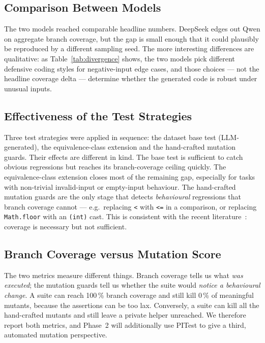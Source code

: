 \documentclass[journal]{IEEEtran}
\begin{document}
\subsection{Comparison Between Models}

The two models reached comparable headline numbers. DeepSeek edges out
Qwen on aggregate branch coverage, but the gap is small enough that it
could plausibly be reproduced by a different sampling seed. The more
interesting differences are qualitative: as Table~\ref{tab:divergence}
shows, the two models pick different defensive coding styles for
negative-input edge cases, and those choices --- not the headline coverage
delta --- determine whether the generated code is robust under unusual
inputs.

\subsection{Effectiveness of the Test Strategies}

Three test strategies were applied in sequence: the dataset base test
(LLM-generated), the equivalence-class extension and the hand-crafted
mutation guards. Their effects are different in kind. The base test is
sufficient to catch obvious regressions but reaches its branch-coverage
ceiling quickly. The equivalence-class extension closes most of the
remaining gap, especially for tasks with non-trivial invalid-input or
empty-input behaviour. The hand-crafted mutation guards are the only
stage that detects \emph{behavioural} regressions that branch coverage
cannot --- e.g.\ replacing \verb|<| with \verb|<=| in a comparison, or
replacing \texttt{Math.floor} with an \texttt{(int)} cast. This is
consistent with the recent
literature~\cite{metatestgen,yang2024,lit_review}: coverage is necessary
but not sufficient.

\subsection{Branch Coverage versus Mutation Score}

The two metrics measure different things. Branch coverage tells us what
\emph{was executed}; the mutation guards tell us whether the suite would
\emph{notice a behavioural change}. A suite can reach 100\,\% branch
coverage and still kill 0\,\% of meaningful mutants, because the
assertions can be too lax. Conversely, a suite can kill all the
hand-crafted mutants and still leave a private helper unreached. We
therefore report both metrics, and Phase~2 will additionally use PITest to
give a third, automated mutation perspective.
\end{document}
